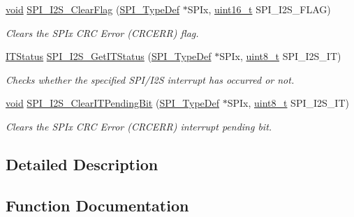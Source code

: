 \begin{DoxyCompactItemize}
\hyperlink{usb__devapi_8h_afabf60e7f57651d6d595a02c75f07cd0}{void} \hyperlink{group___s_p_i___private___functions_ga3aabd9e2437e213056c0ed9bdfa1a724}{S\+P\+I\+\_\+\+I2\+S\+\_\+\+Clear\+Flag} (\hyperlink{struct_s_p_i___type_def}{S\+P\+I\+\_\+\+Type\+Def} $\ast$S\+P\+Ix, \hyperlink{_p_e___types_8h_a1f1825b69244eb3ad2c7165ddc99c956}{uint16\+\_\+t} S\+P\+I\+\_\+\+I2\+S\+\_\+\+F\+L\+AG)
\begin{DoxyCompactList}\small\item\em Clears the S\+P\+Ix C\+RC Error (C\+R\+C\+E\+RR) flag. \end{DoxyCompactList}\item 
\hyperlink{agilefox_2library_2inc_2stm32f10x__type_8h_aacbd7ed539db0aacd973a0f6eca34074}{I\+T\+Status} \hyperlink{group___s_p_i___private___functions_ga72decbc1cd79f8fad92a2204beca6bc5}{S\+P\+I\+\_\+\+I2\+S\+\_\+\+Get\+I\+T\+Status} (\hyperlink{struct_s_p_i___type_def}{S\+P\+I\+\_\+\+Type\+Def} $\ast$S\+P\+Ix, \hyperlink{_p_e___types_8h_aba7bc1797add20fe3efdf37ced1182c5}{uint8\+\_\+t} S\+P\+I\+\_\+\+I2\+S\+\_\+\+IT)
\begin{DoxyCompactList}\small\item\em Checks whether the specified S\+P\+I/\+I2S interrupt has occurred or not. \end{DoxyCompactList}\item 
\hyperlink{usb__devapi_8h_afabf60e7f57651d6d595a02c75f07cd0}{void} \hyperlink{group___s_p_i___private___functions_ga35a524a49ff3d058137060f751e8749f}{S\+P\+I\+\_\+\+I2\+S\+\_\+\+Clear\+I\+T\+Pending\+Bit} (\hyperlink{struct_s_p_i___type_def}{S\+P\+I\+\_\+\+Type\+Def} $\ast$S\+P\+Ix, \hyperlink{_p_e___types_8h_aba7bc1797add20fe3efdf37ced1182c5}{uint8\+\_\+t} S\+P\+I\+\_\+\+I2\+S\+\_\+\+IT)
\begin{DoxyCompactList}\small\item\em Clears the S\+P\+Ix C\+RC Error (C\+R\+C\+E\+RR) interrupt pending bit. \end{DoxyCompactList}\end{DoxyCompactItemize}


\subsection{Detailed Description}


\subsection{Function Documentation}
